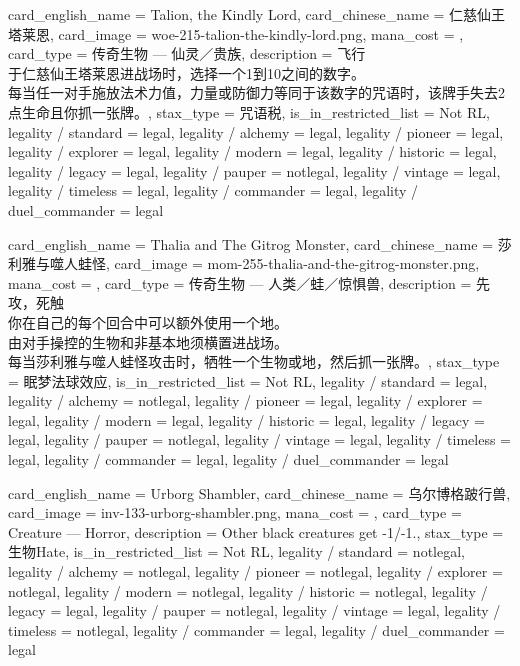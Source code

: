 \documentclass[lang = cn, color = black, 10pt]{AllThatStax}
\begin{document}
\card
{
	card_english_name = {Talion, the Kindly Lord},
	card_chinese_name = {仁慈仙王塔莱恩},
	card_image = woe-215-talion-the-kindly-lord.png,
	mana_cost = ,
	card_type = 传奇生物 — 仙灵／贵族,
	description = {飞行\\
		于仁慈仙王塔莱恩进战场时，选择一个1到10之间的数字。\\
		每当任一对手施放法术力值，力量或防御力等同于该数字的咒语时，该牌手失去2点生命且你抓一张牌。},
	stax_type = 咒语税,
	is_in_restricted_list = Not RL,
	legality / standard = legal,
	legality / alchemy = legal,
	legality / pioneer = legal,
	legality / explorer = legal,
	legality / modern = legal,
	legality / historic = legal,
	legality / legacy = legal,
	legality / pauper = notlegal,
	legality / vintage = legal,
	legality / timeless = legal,
	legality / commander = legal,
	legality / duel_commander = legal
}

\card
{
	card_english_name = {Thalia and The Gitrog Monster},
	card_chinese_name = {莎利雅与噬人蛙怪},
	card_image = mom-255-thalia-and-the-gitrog-monster.png,
	mana_cost = ,
	card_type = 传奇生物 — 人类／蛙／惊惧兽,
	description = {先攻，死触\\
		你在自己的每个回合中可以额外使用一个地。\\
		由对手操控的生物和非基本地须横置进战场。\\
		每当莎利雅与噬人蛙怪攻击时，牺牲一个生物或地，然后抓一张牌。},
	stax_type = 眠梦法球效应,
	is_in_restricted_list = Not RL,
	legality / standard = legal,
	legality / alchemy = notlegal,
	legality / pioneer = legal,
	legality / explorer = legal,
	legality / modern = legal,
	legality / historic = legal,
	legality / legacy = legal,
	legality / pauper = notlegal,
	legality / vintage = legal,
	legality / timeless = legal,
	legality / commander = legal,
	legality / duel_commander = legal
}

\card
{
	card_english_name = {Urborg Shambler},
	card_chinese_name = {乌尔博格跛行兽},
	card_image = inv-133-urborg-shambler.png,
	mana_cost = ,
	card_type = Creature — Horror,
	description = {Other black creatures get -1/-1.},
	stax_type = 生物Hate,
	is_in_restricted_list = Not RL,
	legality / standard = notlegal,
	legality / alchemy = notlegal,
	legality / pioneer = notlegal,
	legality / explorer = notlegal,
	legality / modern = notlegal,
	legality / historic = notlegal,
	legality / legacy = legal,
	legality / pauper = notlegal,
	legality / vintage = legal,
	legality / timeless = notlegal,
	legality / commander = legal,
	legality / duel_commander = legal
}
\end{document}
